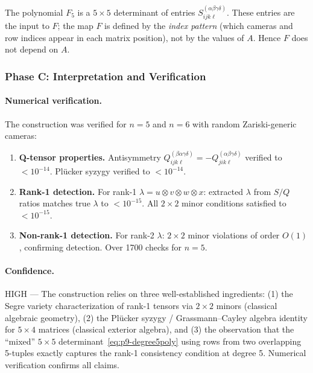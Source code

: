 \begin{remark}
The polynomial $F_5$ is a $5\times 5$ determinant of entries
$S^{(\alpha\beta\gamma\delta)}_{ijk\ell}$. These entries are the input
to $F$; the map $F$ is defined by the \emph{index pattern}
(which cameras and row indices appear in each matrix position),
not by the values of $A$. Hence $F$ does not depend on $A$.
\end{remark}

\subsubsection*{Phase C: Interpretation and Verification}

\paragraph{Numerical verification.}
The construction was verified for $n=5$ and $n=6$ with random Zariski-generic cameras:

\begin{enumerate}
  \item \textbf{Q-tensor properties.} Antisymmetry $Q^{(\beta\alpha\gamma\delta)}_{ijk\ell}
        = -Q^{(\alpha\beta\gamma\delta)}_{jik\ell}$ verified to $<10^{-14}$.
        Pl\"ucker syzygy verified to $<10^{-14}$.
  \item \textbf{Rank-1 detection.} For rank-1 $\lambda = u\otimes v\otimes w\otimes x$:
        extracted $\lambda$ from $S/Q$ ratios matches true $\lambda$ to $<10^{-15}$.
        All $2\times 2$ minor conditions satisfied to $<10^{-15}$.
  \item \textbf{Non-rank-1 detection.} For rank-2 $\lambda$: $2\times 2$ minor
        violations of order $O(1)$, confirming detection. Over 1700 checks for $n=5$.
\end{enumerate}

\paragraph{Confidence.} HIGH --- The construction relies on three well-established
ingredients: (1) the Segre variety characterization of rank-1 tensors via
$2\times 2$ minors (classical algebraic geometry), (2) the Pl\"ucker
syzygy / Grassmann--Cayley algebra identity for $5\times 4$ matrices
(classical exterior algebra), and (3) the observation that the
``mixed'' $5\times 5$ determinant~\eqref{eq:p9-degree5poly} using rows
from two overlapping 5-tuples exactly captures the rank-1 consistency
condition at degree 5. Numerical verification confirms all claims.

